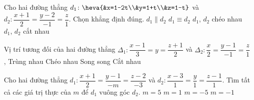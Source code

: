 \begin{ex}
	Cho hai đường thẳng $d_1\colon\heva{&x=1-2t\\&y=1+t\\&z=1-t}$ và $d_2\colon\dfrac{x+1}{2}=\dfrac{y-2}{-1}=\dfrac{z}{1}$. Chọn khẳng định đúng.
	\choice
	{$d_1\parallel d_2$}
	{\True $d_1\equiv d_2$}
	{$d_1$, $d_2$ chéo nhau}
	{$d_1$, $d_2$ cắt nhau}
\end{ex}

\begin{ex}
	Vị trí tương đối của hai đường thẳng $\Delta _1 \colon \dfrac{x-1}{3}=y=\dfrac{z+1}{2}$ và $\Delta _2 \colon \dfrac{x}{2}=\dfrac{y-1}{-1}=\dfrac{z}{1}$,
	\choice
	{Trùng nhau }
	{\True Chéo nhau}
	{Song song}
	{Cắt nhau}
\end{ex}
\begin{ex}
	Cho hai đường thẳng $d_1:\dfrac{x+1}{2}=\dfrac{y-1}{-m}=\dfrac{z-2}{-3}$ và $d_2: \dfrac{x-3}{1}=\dfrac{y}{1}=\dfrac{z-1}{1}$. Tìm tất cả các giá trị thực của $m$ để $d_1$ vuông góc $d_2$.
	\choice
	{$m=5$}
	{$m=1$}
	{$m=-5$}
	{\True$m=-1$}
	\loigiai{
	}
\end{ex}


